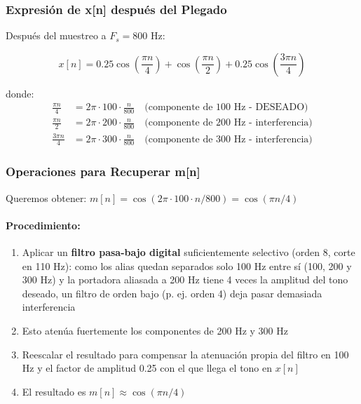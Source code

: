 \documentclass[12pt]{article}
\begin{document}
\subsubsection*{Expresión de x[n] después del Plegado}

Después del muestreo a $F_s = 800$ Hz:

\begin{equation}
\boxed{x[n] = 0.25\cos\left(\frac{\pi n}{4}\right) + \cos\left(\frac{\pi n}{2}\right) + 0.25\cos\left(\frac{3\pi n}{4}\right)}
\end{equation}

donde:
\begin{align}
\frac{\pi n}{4} &= 2\pi \cdot 100 \cdot \frac{n}{800} \quad \text{(componente de 100 Hz - DESEADO)} \\
\frac{\pi n}{2} &= 2\pi \cdot 200 \cdot \frac{n}{800} \quad \text{(componente de 200 Hz - interferencia)} \\
\frac{3\pi n}{4} &= 2\pi \cdot 300 \cdot \frac{n}{800} \quad \text{(componente de 300 Hz - interferencia)}
\end{align}

\subsubsection*{Operaciones para Recuperar m[n]}

Queremos obtener: $m[n] = \cos(2\pi \cdot 100 \cdot n / 800) = \cos(\pi n / 4)$

\paragraph*{Procedimiento:}
\begin{enumerate}
\item Aplicar un \textbf{filtro pasa-bajo digital} suficientemente selectivo (orden 8, corte en 110 Hz): como los alias quedan separados solo 100 Hz entre sí (100, 200 y 300 Hz) y la portadora aliasada a 200 Hz tiene 4 veces la amplitud del tono deseado, un filtro de orden bajo (p. ej. orden 4) deja pasar demasiada interferencia
\item Esto atenúa fuertemente los componentes de 200 Hz y 300 Hz
\item Reescalar el resultado para compensar la atenuación propia del filtro en 100 Hz y el factor de amplitud 0.25 con el que llega el tono en $x[n]$
\item El resultado es $m[n] \approx \cos(\pi n / 4)$
\end{enumerate}
\end{document}
